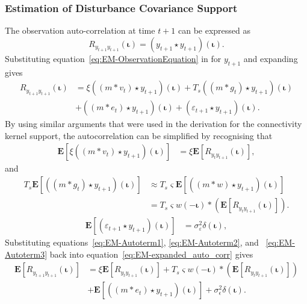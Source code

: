 \documentclass[]{article}
\begin{document}
\subsubsection{Estimation of Disturbance Covariance Support}
The observation auto-correlation at time $t+1$ can be expressed as
\begin{equation}
	R_{y_{t+1}y_{t+1}}(\boldsymbol{\iota})=(y_{t+1} \star y_{t+1})(\boldsymbol\iota).
\end{equation}
Substituting equation~\eqref{eq:EM-ObservationEquation} in for $y_{t+1}$ and expanding gives
\begin{align}\label{eq:EM-expanded_auto_corr}
	R_{y_{t+1}y_{t+1}}(\boldsymbol{\iota}) &= \xi((m \ast v_{t}) \star y_{t+1})(\boldsymbol{\iota}) +T_s((m\ast g_{t})\star y_{t+1})(\boldsymbol{\iota}) \nonumber \\
	&+((m\ast e_{t})\star  y_{t+1})(\boldsymbol{\iota})+(\varepsilon_{t+1} \star y_{t+1})(\boldsymbol{\iota}).
\end{align}
By using similar arguments that were used in the derivation for the connectivity kernel support, the autocorrelation can be simplified by recognising that
\begin{align}\label{eq:EM-Autoterm1}
  \mathbf{E}[\xi((m\ast v_{t})\star y_{t+1})(\boldsymbol{\iota})]&=\xi \mathbf{E}[ R_{y_ty_{t+1}}(\boldsymbol{\iota})],
\end{align}
and
\begin{align}\label{eq:EM-Autoterm2}
	T_s\mathbf{E}[((m\ast g_t) \star y_{t+1})(\boldsymbol\iota)] &\approx T_s\varsigma\mathbf{E}[((m \ast w )\star y_{t+1})(\boldsymbol\iota)] \nonumber\\
	&= T_s\varsigma w(-\boldsymbol\iota) \ast (\mathbf{E}\left[R_{y_ty_{t+1}}(\boldsymbol\iota)\right] ).
\end{align}
\begin{align}\label{eq:EM-Autoterm3}
 \mathbf{E}[(\varepsilon_{t+1}\star y_{t+1})(\boldsymbol\iota)]&=\sigma_{\varepsilon}^2\delta(\boldsymbol{\iota}),
\end{align}
Substituting equations~\eqref{eq:EM-Autoterm1}, \eqref{eq:EM-Autoterm2}, and ~\eqref{eq:EM-Autoterm3} back into equation~\eqref{eq:EM-expanded_auto_corr} gives
\begin{align}\label{eq:EM-Auto&CrossNoisy}
	\mathbf{E}[R_{y_{t+1}y_{t+1}}(\boldsymbol{\iota})] &= \xi \mathbf{E}[R_{y_ty_{t+1}}(\boldsymbol{\iota})]+T_s\varsigma w(-\boldsymbol\iota) \ast (\mathbf{E}\left[R_{y_ty_{t+1}}(\boldsymbol\iota)\right] ) \nonumber \\
	&+\mathbf{E}[((m\ast e_t)\star y_{t+1})(\boldsymbol\iota)] +\sigma_{\epsilon}^2\delta(\boldsymbol{\iota}).
\end{align}
\end{document}
